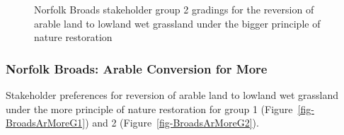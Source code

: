 \documentclass[
  12pt,
  letterpaper,
  DIV=11,
  numbers=noendperiod]{scrartcl}
\begin{document}
\begin{figure}[H]


\caption{\label{fig-BroadsArBigG2}Norfolk Broads stakeholder group 2
gradings for the reversion of arable land to lowland wet grassland under
the bigger principle of nature restoration}

\end{figure}%

\newpage{}

\subsubsection{Norfolk Broads: Arable Conversion for
More}\label{norfolk-broads-arable-conversion-for-more}

Stakeholder preferences for reversion of arable land to lowland wet
grassland under the more principle of nature restoration for group 1
(Figure~\ref{fig-BroadsArMoreG1}) and 2
(Figure~\ref{fig-BroadsArMoreG2}).
\end{document}
